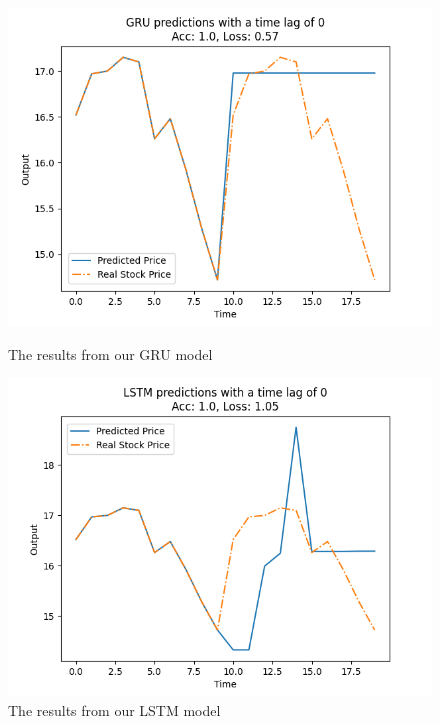 \documentclass{ledger}
\begin{document}
\begin{figure}[!htbp]
    \begin{minipage}{0.49\textwidth}
        \centering
        \includegraphics[width=\linewidth]{images/gruEval}
        \caption{The results from our GRU model}\label{Fig:gruEval}
    \end{minipage}\hfill
    \begin{minipage}{0.49\textwidth}
        \centering
        \includegraphics[width=\linewidth]{images/lstmEval}
        \caption{The results from our LSTM model}\label{Fig:lstmEval}
    \end{minipage}
    \begin{minipage}{0.49\textwidth}
        \centering

\end{minipage}
\end{figure}
\end{document}
